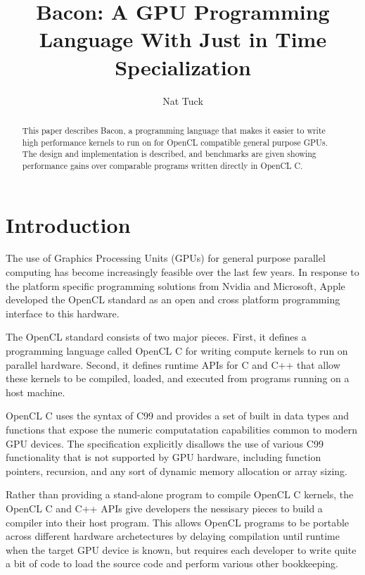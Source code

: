 \documentclass{llncs}
\begin{document}
\title{Bacon: A GPU Programming Language With Just in Time Specialization}

\author{Nat Tuck}


\maketitle

\begin{abstract}

This paper describes Bacon, a programming language that makes it
easier to write high performance kernels to run on for OpenCL
compatible general purpose GPUs. The design and implementation is
described, and benchmarks are given showing performance gains over
comparable programs written directly in OpenCL C.

\end{abstract}

\section{Introduction}

The use of Graphics Processing Units (GPUs) for general purpose
parallel computing has become increasingly feasible over the last few
years. In response to the platform specific programming solutions from
Nvidia and Microsoft, Apple developed the OpenCL standard as an open and
cross platform programming interface to this hardware.

The OpenCL standard\cite{opencl} consists of two major pieces. First,
it defines a programming language called OpenCL C for writing compute
kernels to run on parallel hardware. Second, it defines runtime APIs
for C and C++ that allow these kernels to be compiled, loaded, and
executed from programs running on a host machine.

OpenCL C uses the syntax of C99 and provides a set of built in data
types and functions that expose the numeric computatation capabilities
common to modern GPU devices. The specification explicitly disallows
the use of various C99 functionality that is not supported by GPU
hardware, including function pointers, recursion, and any sort of
dynamic memory allocation or array sizing. 

Rather than providing a stand-alone program to compile OpenCL C
kernels, the OpenCL C and C++ APIs give developers the nessisary
pieces to build a compiler into their host program. This allows OpenCL
programs to be portable across different hardware archetectures by
delaying compilation until runtime when the target GPU device is
known, but requires each developer to write quite a bit of code to
load the source code and perform various other bookkeeping.
\end{document}
